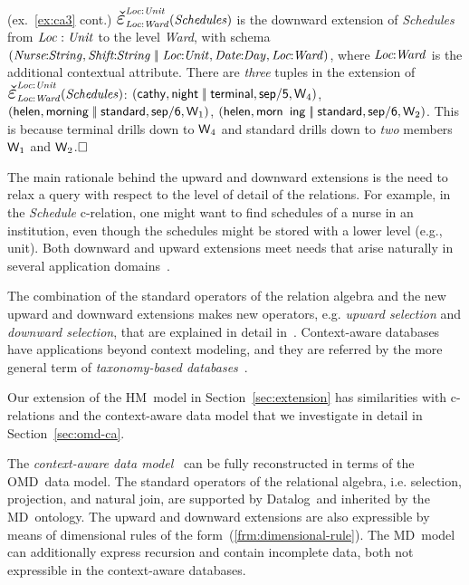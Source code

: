 \documentclass[format=acmsmall, review=false, screen=true]{acmart}
\newcommand{\downext}[3]{\scalebox{1.5}{\ensuremath{\check{\varepsilon}}}_{#1}^{#2}(#3)}
\newcommand{\boxtheorem}{\ensuremath{\hfill \Box}}
\newcommand{\nit}[1]{{\it #1}}
\newcommand{\da}{Datalog}
\newcommand{\omd}{OMD}
\newcommand{\hm}{HM}
\newcommand{\md}{MD}
\begin{document}
{\begin{example} \label{ex:ca5} (ex.~\ref{ex:ca3} cont.) $\downext{\nit{Loc}:\nit{Ward}}{\nit{Loc}:\nit{Unit}}{\nit{Schedules}}$ is the downward extension of \nit{Schedules} from $\nit{Loc}:\nit{Unit}$ to the level \nit{Ward}, with schema $(\nit{Nurse}\!\!:\!\!\nit{String},\nit{Shift}\!\!:\!\!\nit{String}\;|\!|\;\nit{Loc}\!\!:\!\!\nit{Unit},\nit{Date}\!\!:\!\!\nit{Day},\nit{Loc}\!\!:\!\!\nit{Ward})$, where $\nit{Loc}\!\!:\!\!\nit{Ward}$ is the additional contextual attribute. There are {\em three} tuples in the extension of $\downext{\nit{Loc}:\nit{Ward}}{\nit{Loc}:\nit{Unit}}{\nit{Schedules}}$: $({\sf cathy},{\sf night}\;|\!|\;{\sf terminal},{\sf sep/5}, {\sf W}_4)$, $({\sf helen},{\sf morning}\;|\!|\;{\sf standard},{\sf sep/6},{\sf W}_1)$, $({\sf helen},{\sf morn}$ \- ${\sf ing}\;|\!|\;{\sf standard},{\sf sep/6},{\sf W}_2)$. This is because {\sf terminal} drills down to ${\sf W}_4$ and {\sf standard} drills down to {\em two} members ${\sf W}_1$ and ${\sf W}_2$.\boxtheorem
\end{example}

The main rationale behind the upward and downward extensions is the need to relax a query with respect to the level of detail of the relations. For example, in the \nit{Schedule} c-relation, one might want to find schedules of a nurse in an institution, even though the schedules might be stored with a lower level (e.g., unit). Both downward and upward extensions meet needs that arise naturally in several application domains~\cite{martinenghi-er}.

The combination of the standard operators of the relation algebra and the new upward and downward extensions makes new operators, e.g. {\em upward selection} and {\em downward selection}, that are explained in detail in~\cite{martinenghi-vldb}. Context-aware databases have applications beyond context modeling, and they are referred by the more general term of {\em taxonomy-based databases}~\cite{martinenghi-er,martinenghi-vldb}.

Our extension of the \hm \ model in Section~\ref{sec:extension} has similarities with c-relations and the context-aware data model that we investigate in detail in Section~\ref{sec:omd-ca}.

The {\em context-aware data model}~\cite{martinenghi-qa,martinenghi-er,martinenghi-vldb} can be fully reconstructed in terms of the \omd \ data model. The standard operators of the relational algebra, i.e. selection, projection, and natural join, are supported by \da \ and inherited by the \md \ ontology. The upward and downward extensions are also expressible by means of dimensional rules of the form~(\ref{frm:dimensional-rule}). The \md \ model can additionally express recursion and contain incomplete data, both not expressible in the context-aware databases.

}
\end{document}
